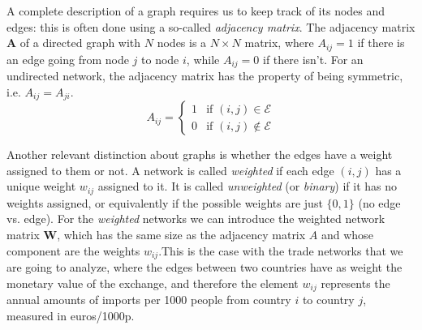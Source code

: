 A complete description of a graph requires us to keep track of its nodes and edges: this is often done using a so-called \textit{adjacency matrix}. The adjacency matrix $\mathbf{A}$ of a directed graph with $N$ nodes is a $N \times N$ matrix, where $A_{ij} = 1$ if there is an edge going from node $j$ to node $i$, while $A_{ij} = 0$ if there isn't. For an undirected network, the adjacency matrix has the property of being symmetric, i.e. $A_{ij} = A_{ji}$.
\begin{equation}
    A_{ij} = \begin{cases}
        1 & \text{if } (i,j) \in \mathcal{E} \\
        0 & \text{if } (i,j) \notin \mathcal{E}
    \end{cases}
\end{equation}

Another relevant distinction about graphs is whether the edges have a weight assigned to them or not. A network is called \textit{weighted} if each edge $(i,j)$ has a unique weight $w_{ij}$ assigned to it. It is called \textit{unweighted} (or \textit{binary}) if it has no weights assigned, or equivalently if the possible weights are just $\{0,1\}$ (no edge vs. edge). For the \textit{weighted} networks we can introduce the weighted network matrix $\mathbf{W}$, which has the same size as the adjacency matrix $A$ and whose component are the weights $w_{ij}$.This is the case with the trade networks that we are going to analyze, where the edges between two countries have as weight the monetary value of the exchange, and therefore the element $w_{ij}$ represents the annual amounts of imports per 1000 people from country $i$ to country $j$, measured in euros/1000p.


